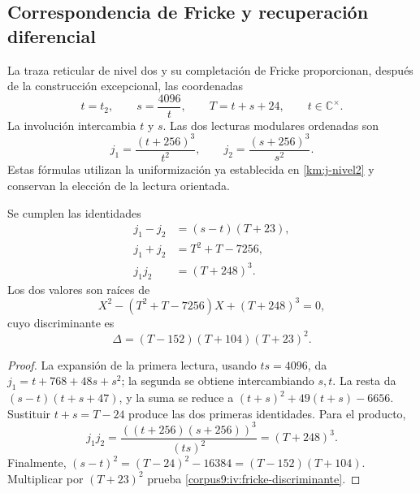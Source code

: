 \subsection{Correspondencia de Fricke y recuperación diferencial}
\label{corpus9:iv:fricke}

La traza reticular de nivel dos y su completación de Fricke
proporcionan, después de la construcción excepcional, las
coordenadas
\[
 t=t_2,\qquad s=\frac{4096}{t},\qquad
 T=t+s+24,\qquad t\in\mathbb C^\times.
\]
La involución intercambia \(t\) y \(s\). Las dos lecturas modulares
ordenadas son
\[
 j_1=\frac{(t+256)^3}{t^2},\qquad
 j_2=\frac{(s+256)^3}{s^2}.
\]
Estas fórmulas utilizan la uniformización ya establecida en
\eqref{km:j-nivel2} y conservan la elección de la lectura orientada.

\begin{proposition}
\label{corpus9:iv:fricke-correspondencia}
Se cumplen las identidades
\begin{align}
 j_1-j_2&=(s-t)(T+23),\\
 j_1+j_2&=T^2+T-7256,\\
 j_1j_2&=(T+248)^3.
 \label{corpus9:iv:fricke-simetricos}
\end{align}
Los dos valores son raíces de
\[
 X^2-(T^2+T-7256)X+(T+248)^3=0,
\]
cuyo discriminante es
\begin{equation}
 \Delta=(T-152)(T+104)(T+23)^2.
 \label{corpus9:iv:fricke-discriminante}
\end{equation}
\end{proposition}
\begin{proof}
La expansión de la primera lectura, usando \(ts=4096\), da
\(j_1=t+768+48s+s^2\); la segunda se obtiene intercambiando
\(s,t\). La resta da \((s-t)(t+s+47)\), y la suma se reduce a
\((t+s)^2+49(t+s)-6656\). Sustituir \(t+s=T-24\) produce
las dos primeras identidades. Para el producto,
\[
 j_1j_2
 =\frac{((t+256)(s+256))^3}{(ts)^2}
 =(T+248)^3.
\]
Finalmente,
\((s-t)^2=(T-24)^2-16384=(T-152)(T+104)\).
Multiplicar por \((T+23)^2\) prueba
\eqref{corpus9:iv:fricke-discriminante}.
\end{proof}

